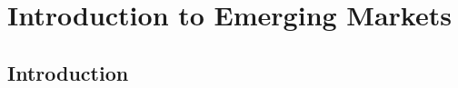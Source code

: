 \chapter{Introduction to Emerging Markets}
\label{chap:intro:markets}

\lipsum[1-2]
\section{Introduction}\label{sec:intro:marketd:intro}
\lipsum[2-4]